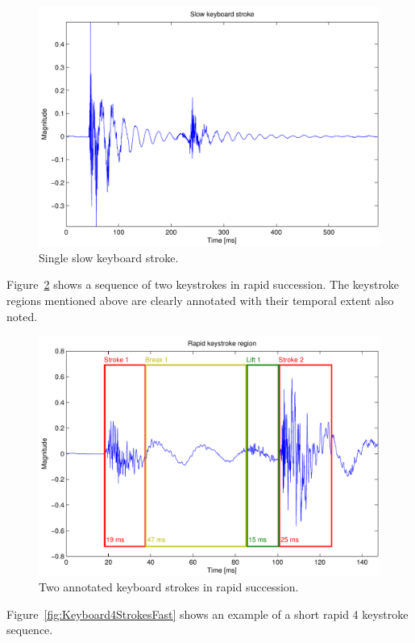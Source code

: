\begin{figure}[!] %
\centering
\includegraphics[width=120mm]{KeyboardStrokeSlow.pdf}
\caption{Single slow keyboard stroke.}\label{fig:KeyboardStrokeSlow}
\end{figure}

Figure~\ref{fig:Keyboard2StrokesFast} shows a sequence of two keystrokes in rapid succession. The keystroke regions mentioned above are clearly annotated with their temporal extent also noted.

\begin{figure}[!] %
\centering
\includegraphics[width=120mm]{Keyboard2StrokesFast.pdf}
\caption{Two annotated keyboard strokes in rapid succession.}\label{fig:Keyboard2StrokesFast}
\end{figure}

Figure~\ref{fig:Keyboard4StrokesFast} shows an example of a short rapid 4 keystroke sequence.

